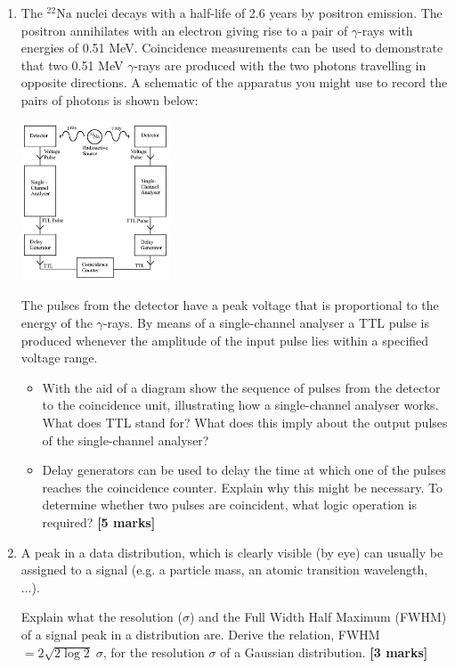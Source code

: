 \begin{enumerate}
\item The $^{22}$Na nuclei decays with a half-life of 2.6 years by positron emission. The positron annihilates with an electron giving rise to a pair of $\gamma$-rays with energies of 0.51 MeV. 
Coincidence measurements can be used to demonstrate that two 0.51 MeV $\gamma$-rays are produced  with the two photons travelling in opposite directions. A schematic  of the apparatus you might use to record the pairs of photons is shown below:
%
\begin{center}
 {\includegraphics[width=0.35\textwidth]{figs/positron-annihilation}}
 \end{center}
%
The pulses from the detector have a peak voltage that is proportional to the energy of the $\gamma$-rays. By means of  a  single-channel analyser  a TTL pulse is  produced whenever the amplitude of the input pulse lies within a specified voltage range.
\begin{itemize}
\item With the aid of a diagram show the sequence of pulses from the detector to the coincidence unit, illustrating how a single-channel analyser works.  What does TTL stand for?
What does this imply about the output pulses of the single-channel analyser?
\item Delay generators can be used to delay the time at which one of the pulses reaches the coincidence counter.
Explain why this might be necessary. %
%
To determine whether two pulses are coincident, what logic operation is required?
\hfill {\bf [5 marks]}
%
\end{itemize}



\item A peak  in a data distribution, which is clearly visible (by eye) can usually be assigned to a signal (e.g. a particle mass, an atomic transition wavelength, ...). 

Explain what  the  resolution ($\sigma$) and the Full Width Half Maximum (FWHM)  of a signal peak in a distribution are. 
Derive the relation, FWHM$  = 2 \sqrt{2 \log 2}\; \sigma$, for the resolution $\sigma$ of a Gaussian distribution.  
\hfill {\bf [3 marks]}\\


\end{enumerate}
